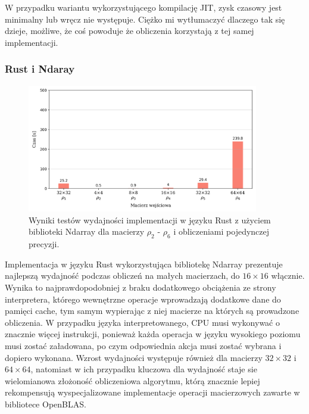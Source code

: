 \documentclass[11pt, a4paper]{article}
\begin{document}
\begin{sloppypar}
    W przypadku wariantu wykorzystującego kompilację JIT, zysk czasowy jest minimalny
    lub wręcz nie występuje. Ciężko mi wytłumaczyć dlaczego tak się dzieje, możliwe, że coś
    powoduje że obliczenia korzystają z tej samej implementacji.

    \subsubsection{ Rust i Ndaray}


    \FloatBarrier
    \begin{figure}[ht]
      \centering
      \includegraphics[width=0.9\textwidth]{"resources/rust_single_tests.png"}
      \caption{Wyniki testów wydajności implementacji w języku Rust z użyciem biblioteki Ndarray dla macierzy $\rho
      _{2}$ - $\rho_{6}$ i obliczeniami pojedynczej precyzji.}
      \label{sp-rust-perf}
    \end{figure}
    \FloatBarrier

    Implementacja w języku Rust wykorzystująca bibliotekę Ndarray prezentuje najlepszą
    wydajność podczas obliczeń na małych macierzach, do $16\times16$ włącznie. Wynika to
    najprawdopodobniej z braku dodatkowego obciążenia ze strony interpretera, którego wewnętrzne
    operacje wprowadzają dodatkowe dane do pamięci cache, tym samym wypierając z niej
    macierze na których są prowadzone obliczenia. W przypadku języka interpretowanego,
    CPU musi wykonywać o znacznie więcej instrukcji, ponieważ każda operacja w języku wysokiego
    poziomu musi zostać załadowana, po czym odpowiednia akcja musi zostać wybrana i
    dopiero wykonana. Wzrost wydajności występuje również dla macierzy $32\times32$ i $64
    \times64$, natomiast w ich przypadku kluczowa dla wydajność staje sie wielomianowa
    złożoność obliczeniowa algorytmu, którą znacznie lepiej rekompensują wyspecjalizowane
    implementacje operacji macierzowych zawarte w bibliotece OpenBLAS.


\end{sloppypar}
\end{document}
